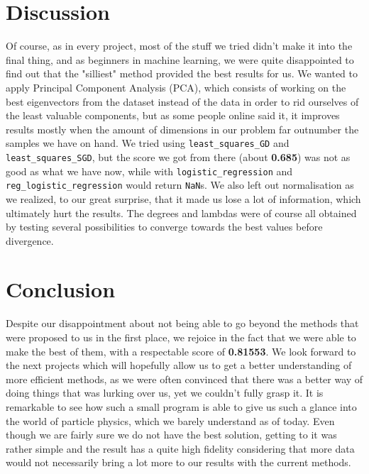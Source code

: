\documentclass[10pt,conference,compsocconf]{IEEEtran}
\begin{document}
\section{Discussion}
Of course, as in every project, most of the stuff we tried didn't make it into the final thing, and as beginners in machine learning, we were quite disappointed to find out that the "silliest" method provided the best results for us. We wanted to apply Principal Component Analysis (PCA), which consists of working on the best eigenvectors from the dataset instead of the data in order to rid ourselves of the least valuable components, but as some people online said it, it improves results mostly when the amount of dimensions in our problem far outnumber the samples we have on hand. We tried using \texttt{least\_squares\_GD} and \texttt{least\_squares\_SGD}, but the score we got from there (about \textbf{0.685}) was not as good as what we have now, while with \texttt{logistic\_regression} and \texttt{reg\_logistic\_regression} would return \texttt{NaN}s. We also left out normalisation as we realized, to our great surprise, that it made us lose a lot of information, which ultimately hurt the results. The degrees and lambdas were of course all obtained by testing several possibilities to converge towards the best values before divergence.
\section{Conclusion}
Despite our disappointment about not being able to go beyond the methods that were proposed to us in the first place, we rejoice in the fact that we were able to make the best of them, with a respectable score of \textbf{0.81553}. We look forward to the next projects which will hopefully allow us to get a better understanding of more efficient methods, as we were often convinced that there was a better way of doing things that was lurking over us, yet we couldn't fully grasp it. It is remarkable to see how such a small program is able to give us such a glance into the world of particle physics, which we barely understand as of today. Even though we are fairly sure we do not have the best solution, getting to it was rather simple and the result has a quite high fidelity considering that more data would not necessarily bring a lot more to our results with the current methods.
\end{document}

